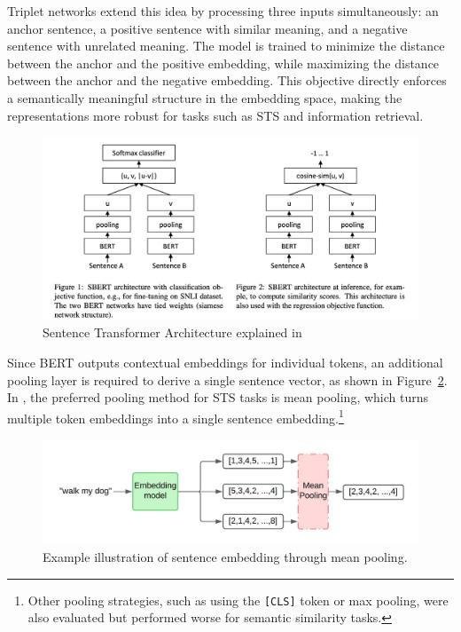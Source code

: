 Triplet networks extend this idea by processing three inputs simultaneously: an anchor sentence, a positive sentence with similar meaning, and a negative sentence with unrelated meaning. The model is trained to minimize the distance between the anchor and the positive embedding, while maximizing the distance between the anchor and the negative embedding. This objective directly enforces a semantically meaningful structure in the embedding space, making the representations more robust for tasks such as \ac{STS} and information retrieval.
\begin{figure}[h!]
    \centering
    \includegraphics[width=1\linewidth]{Images/sentence_transformer.png}
    \caption{Sentence Transformer Architecture explained in\cite{reimers2019sentencebertsentenceembeddingsusing}}
    \label{fig:placeholder}
\end{figure}
Since BERT outputs contextual embeddings for individual tokens, an additional pooling layer is required to derive a single sentence vector, as shown in Figure~\ref{fig:Sentence_embedding}. In \cite{reimers2019sentencebertsentenceembeddingsusing}, the preferred pooling method for \ac{STS} tasks is mean pooling, which turns multiple token embeddings into a single sentence embedding.\footnote{Other pooling strategies, such as using the \texttt{[CLS]} token or max pooling, were also evaluated but performed worse for semantic similarity tasks.}

\begin{figure}[h!]
    \centering
    \includegraphics[width=1\linewidth]{Figures/Sentence_Embedding.jpeg}
    \caption{Example illustration of sentence embedding through mean pooling.}
    \label{fig:Sentence_embedding}
\end{figure}

